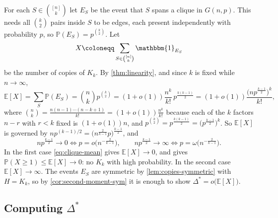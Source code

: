 For each \(S \in \binom{[n]}{k}\) let \(E_S\) be the event that \(S\) spans a clique in \(G(n,p)\). This needs all \(\binom{k}{2}\) pairs inside \(S\) to be edges, each present independently with probability \(p\), so \(\mathbb{P}(E_S) = p^{\binom{k}{2}}\). Let
\[
    X \coloneqq \sum_{S \in \binom{[n]}{k}} \mathbbm{1}_{E_S}
\]
be the number of copies of \(K_k\). By \autoref{thm:linearity}, and since \(k\) is fixed while \(n \to \infty\),
\begin{equation}\label{eq:clique-mean}
    \mathbb{E}[X] = \sum_{S} \mathbb{P}(E_S) = \binom{n}{k} p^{\binom{k}{2}}
    = (1+o(1)) \frac{n^{k}}{k!}\, p^{\frac{k(k-1)}{2}}
    = (1+o(1)) \frac{\bigl( n p^{\frac{k-1}{2}} \bigr)^{k}}{k!},
\end{equation}
where \(\binom{n}{k} = \frac{n(n-1)\cdots(n-k+1)}{k!} = (1+o(1))\frac{n^{k}}{k!}\) because each of the \(k\) factors \(n - r\) with \(r < k\) fixed is \((1+o(1))n\), and \(p^{\binom{k}{2}} = p^{\frac{k(k-1)}{2}} = \bigl( p^{\frac{k-1}{2}} \bigr)^{k}\). So \(\mathbb{E}[X]\) is governed by \(np^{(k-1)/2} = \bigl( n^{\frac{2}{k-1}} p \bigr)^{\frac{k-1}{2}}\), and
\[
    np^{\frac{k-1}{2}} \to 0 \iff p = o\bigl( n^{-\frac{2}{k-1}} \bigr),
    \qquad
    np^{\frac{k-1}{2}} \to \infty \iff p = \omega\bigl( n^{-\frac{2}{k-1}} \bigr).
\]
In the first case \eqref{eq:clique-mean} gives \(\mathbb{E}[X] \to 0\), and  gives \(\mathbb{P}(X \ge 1) \le \mathbb{E}[X] \to 0\): no \(K_k\) with high probability. In the second case \(\mathbb{E}[X] \to \infty\). The events \(E_S\) are symmetric by \autoref{lem:copies-symmetric} with \(H = K_k\), so by \autoref{cor:second-moment-sym} it is enough to show \(\Delta^{*} = o\bigl( \mathbb{E}[X] \bigr)\).

\subsection{Computing \texorpdfstring{\(\Delta^{*}\)}{Delta*}}

